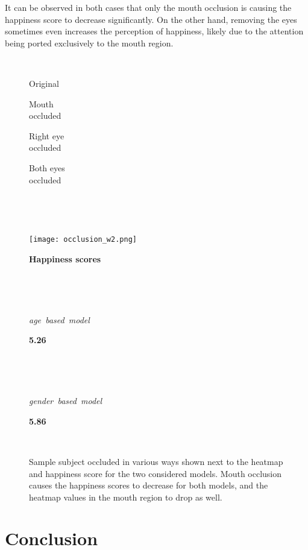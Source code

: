 \documentclass[runningheads]{llncs}
\begin{document}
It can be observed in both cases that only the mouth occlusion is causing the happiness score to decrease significantly. On the other hand, removing the eyes sometimes even increases the perception of happiness, likely due to the attention being ported exclusively to the mouth region.

\begin{figure}[!htb]
\centering \small
\parbox{1.5cm}{~}%
\parbox{2.25cm}{\centering Original}%
\parbox{2.25cm}{\centering Mouth\\occluded}%
\parbox{2.25cm}{\centering Right eye\\occluded}%
\parbox{2.25cm}{\centering Both eyes\\occluded}\\
\parbox{0.9cm}{~}%
%
%
\texttt{[image: occlusion\_w2.png]}\\
\parbox{5.5cm}{\bf Happiness scores}\parbox{7cm}{~}\\
\parbox{2.5cm}{\it age~based~model}%
\parbox{2.25cm}{}%
\parbox{2.25cm}{\centering \bf 5.26}%
\parbox{2.25cm}{}%
\parbox{2.25cm}{}%
\parbox{1cm}{~}\\
\parbox{2.5cm}{\it gender~based~model}%
\parbox{2.25cm}{}%
\parbox{2.25cm}{\centering \bf 5.86}%
\parbox{2.25cm}{}%
\parbox{2.25cm}{}%
\parbox{1cm}{~}
\caption{Sample subject occluded in various ways shown next to the heatmap and happiness score for the two considered models. Mouth occlusion causes the happiness scores to decrease for both models, and the heatmap values in the mouth region to drop as well.}
\label{fig:occlusion}
\end{figure}

\section{Conclusion}
\end{document}
